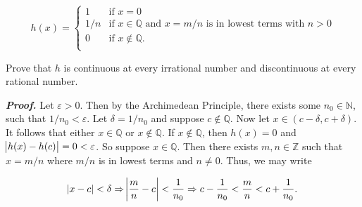 \documentclass[12pt, a4paper]{article}
\begin{document}
\vspace{2mm}

\[ h(x)=  \left\{
\begin{array}{ll}
      1 & \text{if } x=0 \\
      1/n & \text{if } x\in\mathbb{Q} \text{ and $x=m/n$ is in lowest terms with $n>0$} \\
      0 & \text{if } x\notin\mathbb{Q}. \\
\end{array} 
\right. \]

\vspace{4mm}

Prove that $h$ is continuous at every irrational number and discontinuous at every rational number.

\begin{description}
    \item\textit{\textbf{Proof.} } Let $\varepsilon>0$. Then by the Archimedean Principle, there exists some $n_0\in\mathbb{N}$, such that $1/n_0<\varepsilon$. Let $\delta=1/n_0$ and suppose $c\notin\mathbb{Q}$. Now let $x\in(c-\delta,c+\delta)$. It follows that either $x\in\mathbb{Q}$ or $x\notin\mathbb{Q}$. If $x\notin\mathbb{Q}$, then $h(x)=0$ and $\abs{h(x)-h(c)}=0<\varepsilon$. So suppose $x\in\mathbb{Q}$. Then there exists $m,n\in\mathbb{Z}$ such that $x=m/n$ where $m/n$ is in lowest terms and $n\neq0$. Thus, we may write
    
    \begin{equation}
        \abs{x-c}<\delta\Rightarrow\abs{\frac{m}{n}-c}<\frac{1}{n_0}\Rightarrow c-\frac{1}{n_0}<\frac{m}{n}<c+\frac{1}{n_0}.
    \end{equation}
\end{description}
\end{document}
